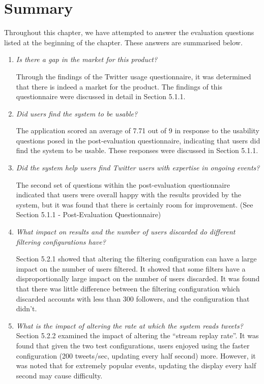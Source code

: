 \documentclass{l4proj}
\begin{document}
    \section{Summary}
    Throughout this chapter, we have attempted to answer the evaluation questions listed at the beginning of the chapter. These answers are summarised below.
    
\begin{enumerate}
\item \textit{Is there a gap in the market for this product?}
\par
Through the findings of the Twitter usage questionnaire, it was determined that there is indeed a market for the product. The findings of this questionnaire were discussed in detail in Section 5.1.1.
\item \textit{Did users find the system to be usable?}
\par
The application scored an average of 7.71 out of 9 in response to the usability questions posed in the post-evaluation questionnaire, indicating that users did find the system to be usable. These responses were discussed in Section 5.1.1.
\item \textit{Did the system help users find Twitter users with expertise in ongoing events?}
\par
The second set of questions within the post-evaluation questionnaire indicated that users were overall happy with the results provided by the system, but it was found that there is certainly room for improvement. (See Section 5.1.1 - Post-Evaluation Questionnaire)
\item \textit{What impact on results and the number of users discarded do different filtering configurations have?}
\par
Section 5.2.1 showed that altering the filtering configuration can have a large impact on the number of users filtered. It showed that some filters have a disproportionally large impact on the number of users discarded. It was found that there was little difference between the filtering configuration which discarded accounts with less than 300 followers, and the configuration that didn't.

\item \textit{What is the impact of altering the rate at which the system reads tweets?}
Section 5.2.2 examined the impact of altering the ``stream replay rate''. It was found that given the two test configurations, users enjoyed using the faster configuration (200 tweets/sec, updating every half second) more. However, it was noted that for extremely popular events, updating the display every half second may cause difficulty.
\end{enumerate}
    
\end{document}
